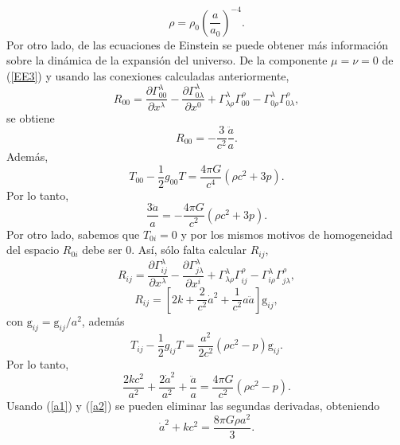 \begin{equation}
\rho =\rho_0 \left(\frac{a}{a_0}\right)^{-4}. \label{radiacion}
\end{equation}
Por otro lado, de las ecuaciones de Einstein se puede obtener más información sobre la dinámica de la expansión del universo. De la componente $\mu=\nu=0$ de (\ref{EE3})
 y usando las conexiones calculadas anteriormente,
\begin{equation}
R_{00}=\frac{\partial\Gamma_{00}^\lambda}{\partial x^\lambda} -\frac{\partial\Gamma_{0\lambda}^\lambda}{\partial x^0}  +\Gamma^\lambda_{\lambda\rho}\Gamma^\rho_{00}  -\Gamma^\lambda_{0\rho}\Gamma^\rho_{0\lambda},          
\end{equation}
se obtiene
\begin{equation}
R_{00}=-\frac{3}{c^2}\frac{\ddot a}{a}.
\end{equation}
Además,
\begin{equation}
T_{00}-\frac{1}{2}g_{00}T=\frac{4\pi G}{c^4}(\rho c^2+3p).
\end{equation}
Por lo tanto,
\begin{equation}
\boxed{\frac{3\ddot a}{a}=-\frac{4\pi G}{c^2}(\rho c^2+3p).} \label{a1}
\end{equation}
Por otro lado, sabemos que $T_{0i}=0$ y por los mismos motivos de homogeneidad del espacio $R_{0i}$ debe ser $0$. Así, sólo 
falta calcular $R_{ij}$,
\begin{equation}
R_{ij}=\frac{\partial\Gamma_{ij}^\lambda}{\partial x^\lambda} -\frac{\partial\Gamma_{j\lambda}^\lambda}{\partial x^i}  +\Gamma^\lambda_{\lambda\rho}\Gamma^\rho_{ij}  -\Gamma^\lambda_{i\rho}\Gamma^\rho_{j\lambda},   
\end{equation}
\begin{equation}
R_{ij}= \left[2k +\frac{2}{c^2}\dot a^2 +\frac{1}{c^2}a\ddot a\right] \mbox{\~g}_{ij},
\end{equation}
con $\mbox{\~g}_{ij}=\mbox{g}_{ij}/a^2$, además
\begin{equation}
T_{ij}-\frac{1}{2}g_{ij}T=\frac{a^2}{2c^2}(\rho c^2- p)\mbox{\~g}_{ij}.
\end{equation}
Por lo tanto,
\begin{equation}
\boxed{\frac{2kc^2}{a^2} +\frac{2\dot a^2}{a^2} +\frac{\ddot a}{a}= \frac{4\pi G}{c^2}(\rho c^2- p).} \label{a2}
\end{equation}
Usando (\ref{a1}) y (\ref{a2}) se pueden eliminar las segundas derivadas, obteniendo
\begin{equation}
\boxed{\dot a^2 +kc^2  = \frac{8\pi G\rho a^2}{3}.} \label{dota}
\end{equation}

